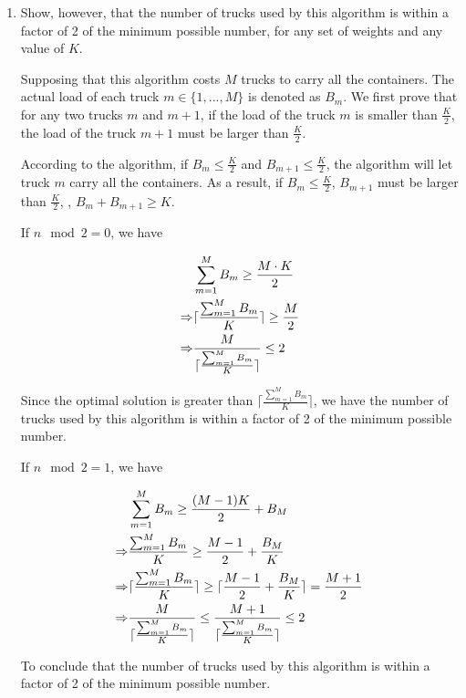 \begin{problem}
\begin{enumerate}
    
    \item Show, however, that the number of trucks used by this algorithm is within a factor of 2 of the minimum possible number, for any set of weights and any value of $K$.
        
    \Answer Supposing that this algorithm costs $M$ trucks to carry all the containers. The actual load of each truck $m \in \{1,...,M\}$ is denoted as $B_m$. We first prove that for any two trucks $m$ and $m+1$, if the load of the truck $m$ is smaller than $\frac{K}{2}$, the load of the truck $m+1$ must be larger than $\frac{K}{2}$.
        
    According to the algorithm, if $B_m \leq \frac{K}{2}$ and $B_{m+1}\leq \frac{K}{2}$, the algorithm will let truck $m$ carry all the containers. As a result, if $B_m \leq \frac{K}{2}$, $B_{m+1}$ must be larger than $\frac{K}{2}$, \ie, $B_m + B_{m+1} \geq K$.

    If $n \mod 2 =0$, we have
    
    \begin{align}
    \notag & \sum_{m=1}^{M} B_m \geq \frac{M \cdot K}{2} \\
    \notag \Rightarrow & \lceil\frac{\sum_{m=1}^{M} B_m}{K}\rceil \geq \frac{M}{2}\\
    \Rightarrow & \frac{M}{\lceil\frac{\sum_{m=1}^{M} B_m}{K}\rceil} \leq 2
    \end{align}
  
    Since the optimal solution is greater than $\lceil\frac{\sum_{m=1}^{M} B_m}{K}\rceil$, we have the number of trucks used by this algorithm is within a factor of 2 of the minimum possible number.
  
    If $n \mod 2 =1$, we have 
    
    \begin{align}
    \notag & \sum_{m=1}^{M} B_m \geq \frac{(M-1) K}{2} +B_M \\
    \notag \Rightarrow & \frac{\sum_{m=1}^{M} B_m}{K} \geq \frac{M-1}{2} +\frac{B_M}{K}\\
    \notag \Rightarrow & \lceil\frac{\sum_{m=1}^{M} B_m}{K}\rceil \geq \lceil\frac{M-1}{2} +\frac{B_M}{K}\rceil= \frac{M+1}{2} \\
    \Rightarrow & \frac{M}{\lceil\frac{\sum_{m=1}^{M} B_m}{K}\rceil} \leq \frac{M+1}{\lceil\frac{\sum_{m=1}^{M} B_m}{K}\rceil} \leq 2
    \end{align}

    To conclude that the number of trucks used by this algorithm is within a factor of 2 of the minimum possible number.
  \end{enumerate} 
\end{problem}
  
